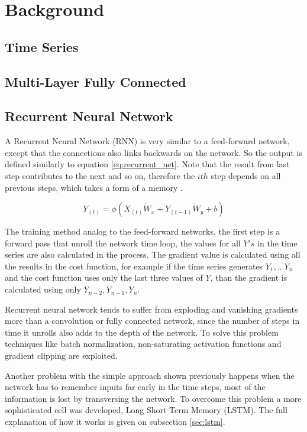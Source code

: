 \section{Background}
\label{sec:background}

\subsection{Time Series}

\subsection{Multi-Layer Fully Connected}



\subsection{Recurrent Neural Network}

A Recurrent Neural Network (RNN) is very similar to a feed-forward network, 
except that the connections also links backwards on the network.
So the output is defined similarly to equation \ref{eq:recurrent_net}.
Note that the result from last step contributes to the next and so on,
therefore the $ith$ step depends on all previous steps,
which takes a form of a memory \cite{geron2017hands}.

\begin{equation}
\label{eq:recurrent_net}
Y_{(t)} = \phi(X_{(t)} \dot W_x + Y_{(t-1)} \dot W_y + b)
\end{equation}

The training method analog to the feed-forward networks,
the first step is a forward pass that unroll the network time loop,
the values for all $Y's$ in the time series are also calculated in the process.
The gradient value is calculated using all the results in the cost function,
for example if the time series generates $Y_1, \dots Y_n$ and the cost function uses only the last three values of $Y$,
than the gradient is calculated using only $Y_{n-2}, Y_{n-1} , Y_n$.

Recurrent neural network tends to suffer from exploding and vanishing gradients more than a convolution or fully connected network,
since the number of steps in time it unrolls also adds to the depth of the network.
To solve this problem techniques like batch normalization, non-saturating activation functions and gradient clipping are exploited.

Another problem with the simple approach shown previously happens when the network has to remember inputs far early in the time steps,
most of the information is lost by transversing the network.
To overcome this problem a more sophisticated cell was developed, Long Short Term Memory (LSTM).
The full explanation of how it works is given on subsection \ref{sec:lstm}.
 
